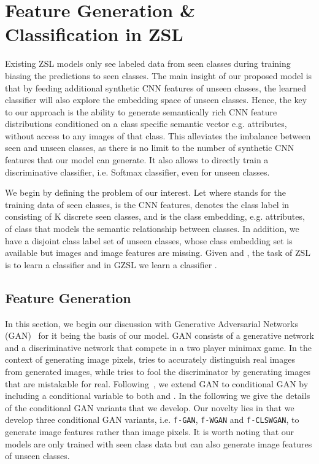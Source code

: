 \documentclass[10pt,twocolumn,letterpaper]{article}
\begin{document}
\section{Feature Generation \& Classification in ZSL}
\label{sec:model}


Existing ZSL models only see labeled data from seen classes during training biasing the predictions to seen classes. The main insight of our proposed model is that by feeding additional synthetic CNN features of unseen classes, the learned classifier will also explore the embedding space of unseen classes. Hence, the key to our approach is the ability to generate semantically rich CNN feature distributions conditioned on a class specific semantic vector e.g. attributes, without access to any images of that class. This alleviates the imbalance between seen and unseen classes, as there is no limit to the number of synthetic CNN features that our model can generate. It also allows to directly train a discriminative classifier, i.e. Softmax classifier, even for unseen classes. 

We begin by defining the problem of our interest. Let   where  stands for the training data of seen classes,  is the CNN features,  denotes the class label in  consisting of K discrete seen classes, and  is the class embedding, e.g. attributes, of class  that models the semantic relationship between classes. 
In addition, we have a disjoint class label set  of unseen classes, whose class embedding set  is available but images and image features are missing. Given  and , the task of ZSL is to learn a classifier  and in GZSL we learn a classifier .





\subsection{Feature Generation}
\label{sec:GAN}
In this section, we begin our discussion with Generative Adversarial Networks (GAN)~\cite{GPMXWDOCB14} for it being the basis of our model. GAN consists of a generative network  and a discriminative network  that compete in a two player minimax game. In the context of generating image pixels,  tries to accurately distinguish real images from generated images, while  tries to fool the discriminator by generating images that are mistakable for real. Following~\cite{conditionalgans}, we extend GAN to  conditional GAN by including a conditional variable to both  and . In the following we give the details of the conditional GAN variants that we develop. Our novelty lies in that we develop three conditional GAN variants, i.e. \texttt{f-GAN}, \texttt{f-WGAN} and \texttt{f-CLSWGAN}, to generate image features rather than image pixels. It is worth noting that our models are only trained with seen class data  but can also generate image features of unseen classes. 
\end{document}
